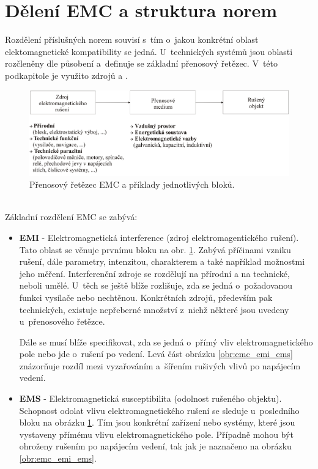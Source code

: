 \section{Dělení EMC a struktura norem}
Rozdělení příslušných norem souvisí s~tím o~jakou konkrétní oblast elektomagnetické kompatibility se jedná. U~technických systémů jsou oblasti rozčleněny dle působení a~definuje se základní přenosový řetězec. V~této podkapitole je využito zdrojů \cite{nfr} a \cite{emc_encyklopedie}.
\begin{figure}[!h]
	\centering
	\includegraphics[width=14.6cm]{emc_retezec.png}
	\caption{Přenosový řetězec EMC a příklady jednotlivých bloků.}
	\label{obr:emc_retezec}
\end{figure}\\
Základní rozdělení EMC se zabývá:
\begin{itemize}
\item {\bf EMI} - Elektromagnetická interference (zdroj elektromagentického rušení). \\
Tato oblast se věnuje prvnímu bloku na obr. \ref{obr:emc_retezec}. Zabývá příčinami vzniku rušení, dále parametry, intenzitou, charakterem a také například možnostmi jeho měření. Interferenční zdroje se rozdělují na přírodní a na technické, neboli umělé. U~těch se ještě blíže rozlišuje, zda se jedná o~požadovanou funkci vysílače nebo nechtěnou. Konkrétních zdrojů, především pak technických, existuje nepřeberné množství z~nichž některé jsou uvedeny u~přenosového řetězce.

Dále se musí blíže specifikovat, zda se jedná o~přímý vliv elektromagnetického pole nebo jde o~rušení po vedení. Levá část obrázku \ref{obr:emc_emi_ems} znázorňuje rozdíl mezi vyzařováním a~šířením rušivých vlivů po napájecím vedení.

\item {\bf EMS} - Elektromagnetická susceptibilita (odolnost rušeného objektu). \\
Schopnost odolat vlivu elektromagnetického rušení se sleduje u~posledního bloku na obrázku \ref{obr:emc_retezec}. Tím jsou konkrétní zařízení nebo systémy, které jsou vystaveny přímému vlivu elektromagnetického pole. Případně mohou být ohroženy rušením po napájecím vedení, tak jak je naznačeno na obrázku \ref{obr:emc_emi_ems}.
\end{itemize}
